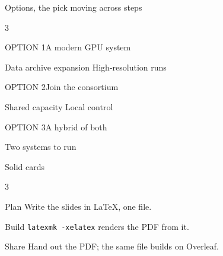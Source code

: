 \documentclass[aspectratio=\engineaspectratio]{beamer}
\begin{document}
\begin{frame}{Options, the pick moving across steps}
  \begin{enginecards}{3}
    \begin{enginecard}[pick=<1>]{OPTION 1}{A modern GPU system}
      \begin{enginestatus}
        \done Data archive expansion
         High-resolution runs
      \end{enginestatus}
    \end{enginecard}
    \begin{enginecard}[pick=<2>]{OPTION 2}{Join the consortium}
      \begin{enginestatus}
        \done Shared capacity
         Local control
      \end{enginestatus}
    \end{enginecard}
    \begin{enginecard}[pick=<3>]{OPTION 3}{A hybrid of both}
      \begin{enginestatus}
        \warn Two systems to run
      \end{enginestatus}
    \end{enginecard}
  \end{enginecards}
\end{frame}

\begin{frame}{Solid cards}
  \begin{enginecards}{3}
    \begin{enginecard}[solid]{Plan}{}
      Write the slides in LaTeX, one file.
    \end{enginecard}
    \begin{enginecard}[solid]{Build}{}
      \texttt{latexmk -xelatex} renders the PDF from it.
    \end{enginecard}
    \begin{enginecard}[solid]{Share}{}
      Hand out the PDF; the same file builds on Overleaf.
    \end{enginecard}
  \end{enginecards}
\end{frame}
\end{document}
